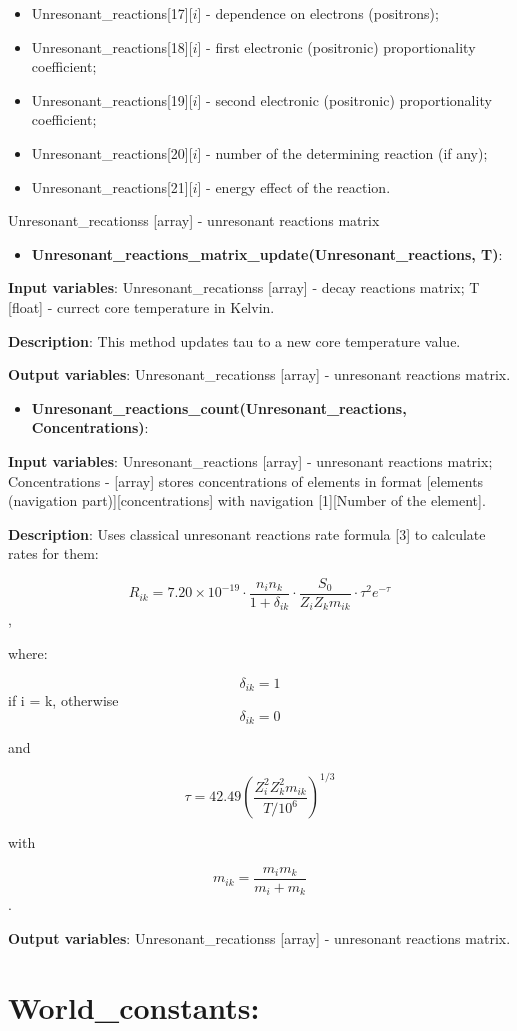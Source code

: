 \documentclass[a4paper,12pt]{article}
\newcommand{\namefunction}[4]{
  \begin{itemize}
    \item \textbf{#1}:
  \end{itemize}
  
  \textbf{Input variables}: #2.
  
  \textbf{Description}: #3.
  
  \textbf{Output variables}: #4.
}
\begin{document}
{\begin{itemize}
    \item Unresonant\_reactions[17][$i$] - dependence on electrons (positrons);
    \item Unresonant\_reactions[18][$i$] - first electronic (positronic) proportionality coefficient;
    \item Unresonant\_reactions[19][$i$] - second electronic (positronic) proportionality coefficient;
    \item Unresonant\_reactions[20][$i$] - number of the determining reaction (if any);
    \item Unresonant\_reactions[21][$i$] - energy effect of the reaction.
\end{itemize}


}{Unresonant\_recationss [array] - unresonant reactions matrix}

\vspace{1em}

\namefunction{Unresonant\_reactions\_matrix\_update(Unresonant\_reactions, T)}{Unresonant\_recationss [array] - decay reactions matrix; T [float] - currect core temperature in Kelvin}{This method updates tau to a new core temperature value}{Unresonant\_recationss [array] - unresonant reactions matrix}

\vspace{1em}

\namefunction{Unresonant\_reactions\_count(Unresonant\_reactions, Concentrations)}{Unresonant\_reactions [array] - unresonant reactions matrix; Concentrations - [array] stores concentrations of elements in format [elements (navigation part)][concentrations] with navigation [1][Number of the element]}{Uses classical unresonant reactions rate formula [3] to calculate rates for them:

\[R_{ik} = 7.20 \times 10^{-19} \cdot \frac{n_i n_k}{1 + \delta_{ik}} \cdot \frac{S_0}{Z_i Z_k m_{ik}} \cdot \tau^2 e^{-\tau}\], 

where:

\[\delta_{ik} = 1\] if i = k, otherwise \[\delta_{ik} = 0\]

and

\[\tau = 42.49 \left(\frac{Z_i^2 Z_k^2 m_{ik}}{T/10^6}\right)^{1/3}\]

with

\[m_{ik} = \frac{m_i m_k}{m_i + m_k}\]}{Unresonant\_recationss [array] - unresonant reactions matrix}

\section{World\_constants:}
\end{document}

